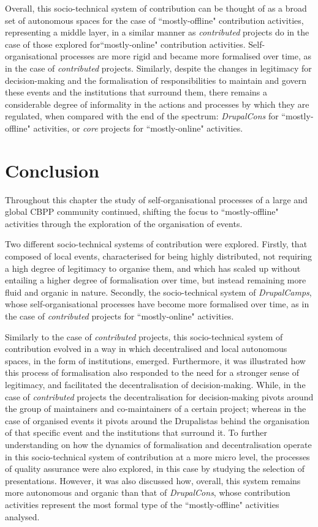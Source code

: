 Overall, this socio-technical system of contribution can be thought of as a broad set of autonomous spaces for the case of ``mostly-offline" contribution activities, representing a middle layer, in a similar manner as \textit{contributed} projects do in the case of those explored for``mostly-online" contribution activities. Self-organisational processes are more rigid and became more formalised over time, as in the case of \textit{contributed} projects. Similarly, despite the changes in legitimacy for decision-making and the formalisation of responsibilities to maintain and govern these events and the institutions that surround them, there remains a considerable degree of informality in the actions and processes by which they are regulated, when compared with the end of the spectrum: \textit{DrupalCons} for ``mostly-offline" activities, or \textit{core} projects for ``mostly-online" activities.

\section{Conclusion}

Throughout this chapter the study of self-organisational processes of a large and global CBPP community continued, shifting the focus to ``mostly-offline" activities through the exploration of the organisation of events.

Two different socio-technical systems of contribution were explored. Firstly, that composed of local events, characterised for being highly distributed, not requiring a high degree of legitimacy to organise them, and which has scaled up without entailing a higher degree of formalisation over time, but instead remaining more fluid and organic in nature. Secondly, the socio-technical system of \textit{DrupalCamps}, whose self-organisational processes have become more formalised over time, as in the case of \textit{contributed} projects for ``mostly-online" activities.

Similarly to the case of \textit{contributed} projects, this socio-technical system of contribution evolved in a way in which decentralised and local autonomous spaces, in the form of institutions, emerged. Furthermore, it was illustrated how this process of formalisation also responded to the need for a stronger sense of legitimacy, and facilitated the decentralisation of decision-making. While, in the case of \textit{contributed} projects the decentralisation for decision-making pivots around the group of maintainers and co-maintainers of a certain project; whereas in the case of organised events it pivots around the Drupalistas behind the organisation of that specific event and the institutions that surround it. To further understanding on how the dynamics of formalisation and decentralisation operate in this socio-technical system of contribution at a more micro level, the processes of quality assurance were also explored, in this case by studying the selection of presentations. However, it was also discussed how, overall, this system remains more autonomous and organic than that of \textit{DrupalCons}, whose contribution activities represent the most formal type of the ``mostly-offline" activities analysed.

